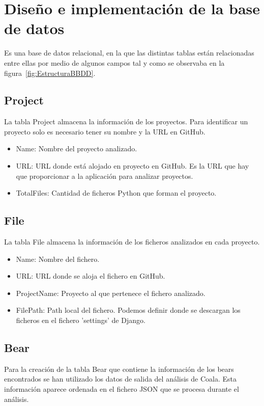\documentclass[a4paper, 12pt]{book}
\begin{document}
\section{Diseño e implementación de la base de datos} 
\label{sec:seccion14}
Es una base de datos relacional, en la que las distintas tablas están relacionadas entre ellas por medio de algunos campos tal y como se observaba en la figura~\ref{fig:EstructuraBBDD}.

\subsection{Project}
\label{sec:seccion14.1}
La tabla Project almacena la información de los proyectos. Para identificar un proyecto solo es necesario tener su nombre y la URL en GitHub.

\begin{itemize}
          \item Name: Nombre del proyecto analizado.
          \item URL: URL donde está alojado en proyecto en GitHub. Es la URL que hay que proporcionar a la aplicación para analizar proyectos.
          \item TotalFiles: Cantidad de ficheros Python que forman el proyecto.
\end{itemize}

\subsection{File}
\label{sec:seccion14.2}
La tabla File almacena la información de los ficheros analizados en cada proyecto.

\begin{itemize}
          \item Name: Nombre del fichero.
          \item URL: URL donde se aloja el fichero en GitHub.
          \item ProjectName: Proyecto al que pertenece el fichero analizado.
          \item FilePath: Path local del fichero. Podemos definir donde se descargan los ficheros en el fichero 'settings' de Django.
\end{itemize}

\subsection{Bear}
\label{sec:seccion14.3}
Para la creación de la tabla Bear que contiene la información de los bears encontrados se han utilizado los datos de salida del análisis de Coala. Esta información aparece ordenada en el fichero JSON que se procesa durante el análisis.
\end{document}
